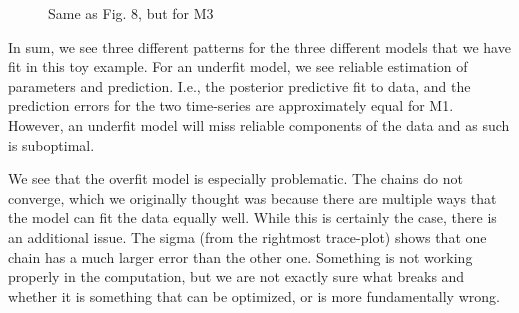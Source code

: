 \documentclass{article}
\begin{document}
\begin{figure}[H]
    \centering
    \quad
    \quad
    \caption{Same as Fig. 8, but for M3}
\end{figure}

\noindent In sum, we see three different patterns for the three different models that we have fit in this toy example. For an underfit model, we see reliable estimation of parameters and prediction. I.e., the posterior predictive fit to data, and the prediction errors for the two time-series are approximately equal for M1. However, an underfit model will miss reliable components of the data and as such is suboptimal. 

\noindent We see that the overfit model is especially problematic. The chains do not converge, which we originally thought was because there are multiple ways that the model can fit the data equally well. While this is certainly the case, there is an additional issue. The sigma (from the rightmost trace-plot) shows that one chain has a much larger error than the other one. Something is not working properly in the computation, but we are not exactly sure what breaks and whether it is something that can be optimized, or is more fundamentally wrong. 
\end{document}

